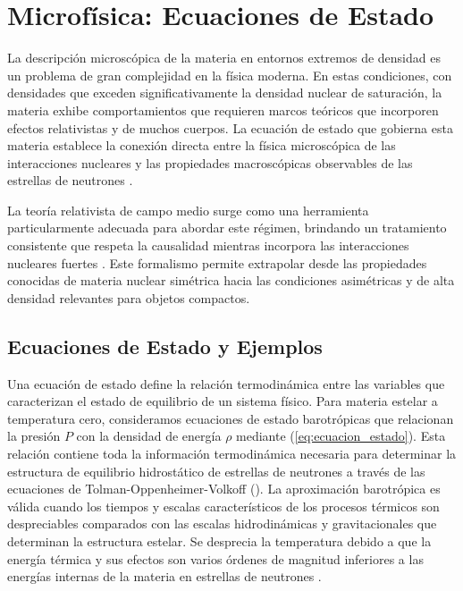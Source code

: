 

\thispagestyle{fancy}
\chapter{Microfísica: Ecuaciones de Estado}

La descripción microscópica de la materia en entornos extremos de densidad es un problema de gran complejidad en la física moderna. En estas condiciones, con densidades que exceden significativamente la densidad nuclear de saturación, la materia exhibe comportamientos que requieren marcos teóricos que incorporen efectos relativistas y de muchos cuerpos. La ecuación de estado que gobierna esta materia establece la conexión directa entre la física microscópica de las interacciones nucleares y las propiedades macroscópicas observables de las estrellas de neutrones \cite{oppenheimerMassiveNeutronCores1939}.

La teoría relativista de campo medio surge como una herramienta particularmente adecuada para abordar este régimen, brindando un tratamiento consistente que respeta la causalidad mientras incorpora las interacciones nucleares fuertes \cite{glendenningCompactStarsNuclear2000}. Este formalismo permite extrapolar desde las propiedades conocidas de materia nuclear simétrica hacia las condiciones asimétricas y de alta densidad relevantes para objetos compactos.

\section{Ecuaciones de Estado y Ejemplos}

Una ecuación de estado define la relación termodinámica entre las variables que caracterizan el estado de equilibrio de un sistema físico. Para materia estelar a temperatura cero, consideramos ecuaciones de estado barotrópicas que relacionan la presión $P$ con la densidad de energía $\rho$ mediante (\ref{eq:ecuacion_estado}). Esta relación contiene toda la información termodinámica necesaria para determinar la estructura de equilibrio hidrostático de estrellas de neutrones a través de las ecuaciones de Tolman-Oppenheimer-Volkoff (\sistemaTOV). La aproximación barotrópica es válida cuando los tiempos y escalas característicos de los procesos térmicos son despreciables comparados con las escalas hidrodinámicas y gravitacionales que determinan la estructura estelar. Se desprecia la temperatura debido a que la energía térmica y sus efectos son varios órdenes de magnitud inferiores a las energías internas de la materia en estrellas de neutrones \cite{shapiroBlackHolesWhite2008}.


